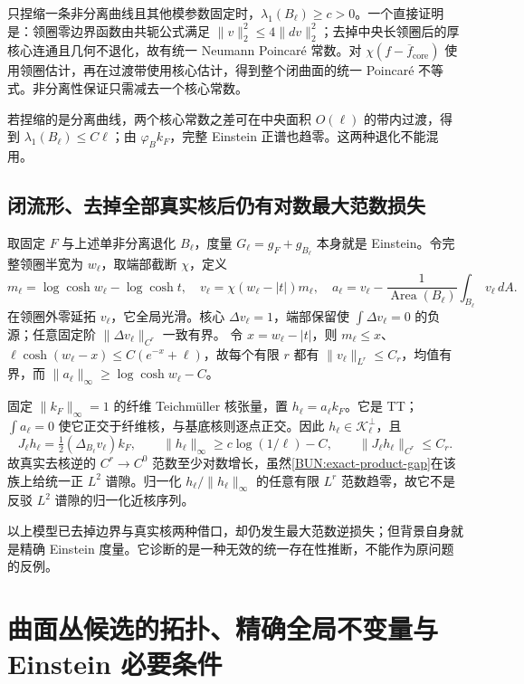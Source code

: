 \documentclass[UTF8,fontset=fandol,zihao=-4,oneside,openany]{ctexbook}
\theoremstyle{cjkplain}
\numberwithin{equation}{chapter}
\begin{document}
只捏缩一条非分离曲线且其他模参数固定时，$\lambda_1(B_\ell)\ge c>0$。一个直接证明是：领圈零边界函数由共轭公式满足 $\|v\|_2^2\le4\|dv\|_2^2$；去掉中央长领圈后的厚核心连通且几何不退化，故有统一 Neumann Poincaré 常数。对 $\chi(f-\overline f_{\mathrm{core}})$ 使用领圈估计，再在过渡带使用核心估计，得到整个闭曲面的统一 Poincaré 不等式。非分离性保证只需减去一个核心常数。

若捏缩的是分离曲线，两个核心常数之差可在中央面积 $O(\ell)$ 的带内过渡，得到 $\lambda_1(B_\ell)\le C\ell$；由 $\varphi_Bk_F$，完整 Einstein 正谱也趋零。这两种退化不能混用。

\subsection{闭流形、去掉全部真实核后仍有对数最大范数损失}
取固定 $F$ 与上述单非分离退化 $B_\ell$，度量 $G_\ell=g_F+g_{B_\ell}$ 本身就是 Einstein。令完整领圈半宽为 $w_\ell$，取端部截断 $\chi$，定义
\[
 m_\ell=\log\cosh w_\ell-\log\cosh t,
 \quad v_\ell=\chi(w_\ell-|t|)m_\ell,
 \quad a_\ell=v_\ell-\frac1{\operatorname{Area}(B_\ell)}\int_{B_\ell}v_\ell\,dA.
\]
在领圈外零延拓 $v_\ell$，它全局光滑。核心 $\Delta v_\ell=1$，端部保留使 $\int\Delta v_\ell=0$ 的负源；任意固定阶 $\|\Delta v_\ell\|_{C^r}$ 一致有界。
令 $x=w_\ell-|t|$，则 $m_\ell\le x$、$\ell\cosh(w_\ell-x)\le C(e^{-x}+\ell)$，故每个有限 $r$ 都有 $\|v_\ell\|_{L^r}\le C_r$，均值有界，而
$\|a_\ell\|_\infty\ge\log\cosh w_\ell-C$。

固定 $\|k_F\|_\infty=1$ 的纤维 Teichmüller 核张量，置 $h_\ell=a_\ell k_F$。它是 TT；$\int a_\ell=0$ 使它正交于纤维核，与基底核则逐点正交。因此 $h_\ell\in\mathcal K_\ell^\perp$，且
\begin{equation}
 J_\ell h_\ell=\tfrac12(\Delta_{B_\ell}v_\ell)k_F,
 \qquad\|h_\ell\|_\infty\ge c\log(1/\ell)-C,
 \qquad\|J_\ell h_\ell\|_{C^r}\le C_r.
 \label{BUN:closed-log-loss}
\end{equation}
故真实去核逆的 $C^r\to C^0$ 范数至少对数增长，虽然\eqref{BUN:exact-product-gap}在该族上给统一正 $L^2$ 谱隙。归一化 $h_\ell/\|h_\ell\|_\infty$ 的任意有限 $L^r$ 范数趋零，故它不是反驳 $L^2$ 谱隙的归一化近核序列。

以上模型已去掉边界与真实核两种借口，却仍发生最大范数逆损失；但背景自身就是精确 Einstein 度量。它诊断的是一种无效的统一存在性推断，不能作为原问题的反例。



\section{曲面丛候选的拓扑、精确全局不变量与 Einstein 必要条件}
\label{BUNTOP:section}
\end{document}
